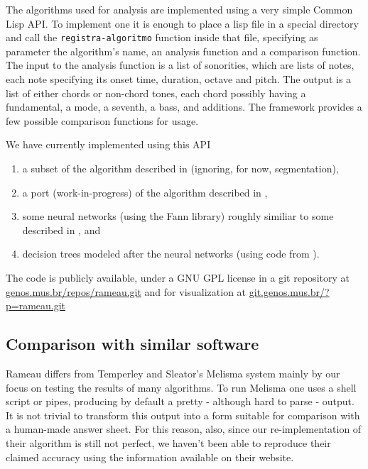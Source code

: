 \documentclass{article}
\begin{document}
The algorithms used for analysis are implemented using a very simple
Common Lisp API. To implement one it is enough to place a lisp file in
a special directory and call the \texttt{registra-algoritmo} function
inside that file, specifying as parameter the algorithm's name, an
analysis function and a comparison function. The input to the analysis
function is a list of sonorities, which are lists of notes, each note
specifying its onset time, duration, octave and pitch. The output is a
list of either chords or non-chord tones, each chord possibly having a
fundamental, a mode, a seventh, a bass, and additions. The framework
provides a few possible comparison functions for usage.

We have currently implemented using this API 
\begin{enumerate}
\item a subset of the algorithm described in \cite{pardo02:algorithms}
  (ignoring, for now, segmentation), 
\item a port (work-in-progress) of the algorithm described in
  \cite{temperley99:modeling}, 
\item some neural networks (using the Fann \cite{nissen:fann}
  library) roughly similiar to some described in
  \cite{tsui02:_harmon_analy_using_neural_networ}, and
\item decision trees modeled after the neural networks (using code
  from \cite{Mitchell:1997:ML}).
\end{enumerate}

The code is publicly available, under a GNU GPL \cite{fsf:gpl} license
in a git \cite{baudis:_git_users_manual} repository at
\url{genos.mus.br/repos/rameau.git} and for visualization at
\url{git.genos.mus.br/?p=rameau.git}

\subsection{Comparison with similar software}
\label{sec:differences-from-similar-software}

Rameau differs from Temperley and Sleator's Melisma
\cite{temperley99:modeling} system mainly by our focus on testing the
results of many algorithms. To run Melisma one uses a shell script or
pipes, producing by default a pretty - although hard to parse -
output. It is not trivial to transform this output into a form
suitable for comparison with a human-made answer sheet. For this
reason, also, since our re-implementation of their algorithm is still
not perfect, we haven't been able to reproduce their claimed accuracy
using the information available on their website.
\end{document}
